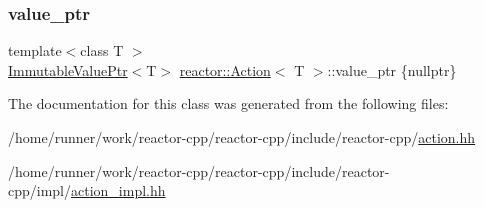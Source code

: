 \subsubsection{\texorpdfstring{value\+\_\+ptr}{value\_ptr}}
{\footnotesize\ttfamily template$<$class T $>$ \\
\hyperlink{classreactor_1_1ImmutableValuePtr}{Immutable\+Value\+Ptr}$<$T$>$ \hyperlink{classreactor_1_1Action}{reactor\+::\+Action}$<$ T $>$\+::value\+\_\+ptr \{nullptr\}\hspace{0.3cm}{\ttfamily [private]}}



The documentation for this class was generated from the following files\+:\begin{DoxyCompactItemize}
\item 
/home/runner/work/reactor-\/cpp/reactor-\/cpp/include/reactor-\/cpp/\hyperlink{action_8hh}{action.\+hh}\item 
/home/runner/work/reactor-\/cpp/reactor-\/cpp/include/reactor-\/cpp/impl/\hyperlink{action__impl_8hh}{action\+\_\+impl.\+hh}\end{DoxyCompactItemize}
